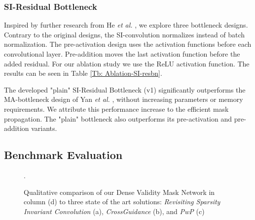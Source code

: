 \documentclass[letterpaper, 10 pt, conference]{ieeeconf}  \usepackage{geometry}
\begin{document}
\subsubsection{SI-Residual Bottleneck}
Inspired by further research from He \textit{et al.} \cite{Preactivation_Resnet}, we explore three bottleneck designs. Contrary to the original designs, the SI-convolution normalizes instead of batch normalization. The pre-activation design uses the activation functions before each convolutional layer. Pre-addition moves the last activation function before the added residual. For our ablation study we use the ReLU activation function. The results can be seen in Table \ref{Tb: Ablation-SI-resbn}.

The developed "plain" SI-Residual Bottleneck (v1) significantly outperforms the MA-bottleneck design of Yan \textit{et al.} \cite{Revisiting_Sparsity}, without increasing parameters or memory requirements. We attribute this performance increase to the efficient mask propagation. The "plain" bottleneck also outperforms its pre-activation and pre-addition variants.

\subsection{Benchmark Evaluation}
\begin{figure}[t]
	\centering
	\caption{Qualitative comparison of our Dense Validity Mask Network in column (d) to three state of the art solutions: \textit{Revisiting Sparsity Invariant Convolution} \cite{Revisiting_Sparsity} (a), \textit{CrossGuidance} \cite{CrossGuidance} (b), and \textit{PwP} \cite{PWP} (c)}. 
	\label{pic:Kap4:Qualitative}
\end{figure}
\end{document}
